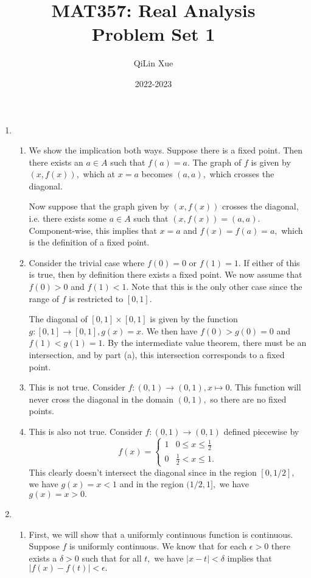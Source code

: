 \documentclass{article}
\title{\vspace{-2cm}MAT357: Real Analysis \\ Problem Set 1}
\author{QiLin Xue}
\date{2022-2023}
\numberwithin{equation}{section}
\begin{document}
\maketitle
\begin{enumerate}
    \item \begin{enumerate}[label=(\alph*)]
        \item We show the implication both ways. Suppose there is a fixed point. Then there exists an $a \in A$ such that $f(a)=a.$ The graph of $f$ is given by $(x,f(x)),$ which at $x=a$ becomes $(a,a),$ which crosses the diagonal.
        
        Now suppose that the graph given by $(x,f(x))$ crosses the diagonal, i.e. there exists some $a\in A$ such that $(x,f(x))=(a,a).$ Component-wise, this implies that $x=a$ and $f(x)=f(a)=a,$ which is the definition of a fixed point.
        \item Consider the trivial case where $f(0)=0$ or $f(1)=1.$ If either of this is true, then by definition there exists a fixed point. We now assume that $f(0) > 0$ and $f(1) < 1.$ Note that this is the only other case since the range of $f$ is restricted to $[0,1].$
        
        The diagonal of $[0,1]\times [0,1]$ is given by the function $g:[0,1]\to [0,1], g(x)=x.$ We then have $f(0)>g(0)=0$ and $f(1)<g(1)=1.$ By the intermediate value theorem, there must be an intersection, and by part (a), this intersection corresponds to a fixed point.
        \item This is not true. Consider $f:(0,1)\to (0,1), x \mapsto 0.$ This function will never cross the diagonal in the domain $(0,1),$ so there are no fixed points.
        \item This is also not true. Consider $f:(0,1)\to (0,1)$ defined piecewise by 
        \begin{equation}
            f(x) = \begin{cases}
                1  & 0 \le x \le \frac{1}{2} \\ 
                0 & \frac{1}{2} < x \le 1.
            \end{cases}
        \end{equation}
        This clearly doesn't intersect the diagonal since in the region $[0,1/2],$ we have $g(x)=x < 1$ and in the region $(1/2,1],$ we have $g(x)=x > 0.$
    \end{enumerate}
    \newpage
    \item \begin{enumerate}
        \item First, we will show that a uniformly continuous function is continuous. Suppose $f$ is uniformly continuous. We know that for each $\epsilon > 0$ there exists a $\delta > 0$ such that for all $t,$ we have $|x-t|<\delta$ implies that $|f(x)-f(t)|<\epsilon.$
        

\end{enumerate}
\end{enumerate}
\end{document}
